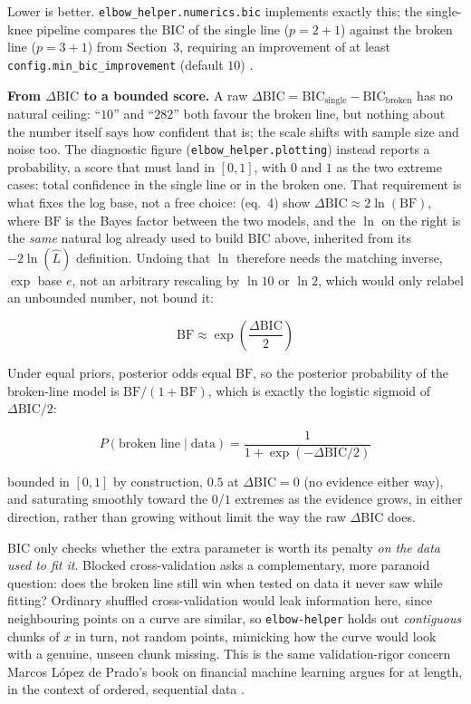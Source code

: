 \documentclass[11pt]{article}
\newcommand{\code}[1]{\texttt{#1}}
\begin{document}
Lower is better. \code{elbow\_helper.numerics.bic} implements exactly
this; the single-knee pipeline compares the $\mathrm{BIC}$ of the single
line ($p = 2 + 1$) against the broken line ($p = 3 + 1$) from Section~3,
requiring an improvement of at least \code{config.min\_bic\_improvement}
(default $10$) \citep{schwarz1978} \citep{hastie2009esl} \citep{bishop2006prml}.

\textbf{From $\Delta\mathrm{BIC}$ to a bounded score.} A raw
$\Delta\mathrm{BIC} = \mathrm{BIC}_{\text{single}} -
\mathrm{BIC}_{\text{broken}}$ has no natural ceiling: ``$10$'' and
``$282$'' both favour the broken line, but nothing about the number itself
says how confident that is; the scale shifts with sample size and noise
too. The diagnostic figure (\code{elbow\_helper.plotting}) instead reports
a probability, a score that must land in $[0, 1]$, with $0$ and $1$ as the
two extreme cases: total confidence in the single line or in the broken
one. That requirement is what fixes the log base, not a free
choice: \citet{kassraftery1995} (eq.~4) show
$\Delta\mathrm{BIC} \approx 2 \ln(\mathrm{BF})$, where $\mathrm{BF}$ is the
Bayes factor between the two models, and the $\ln$ on the right is the
\emph{same} natural log already used to build $\mathrm{BIC}$ above,
inherited from its $-2\ln(\hat L)$ definition. Undoing that $\ln$ therefore
needs the matching inverse, $\exp$ base $e$, not an arbitrary rescaling by
$\ln 10$ or $\ln 2$, which would only relabel an unbounded number, not
bound it:

\begin{equation}
\mathrm{BF} \approx \exp\!\left(\frac{\Delta\mathrm{BIC}}{2}\right)
\end{equation}

Under equal priors, posterior odds equal $\mathrm{BF}$, so the posterior
probability of the broken-line model is $\mathrm{BF} / (1 + \mathrm{BF})$,
which is exactly the logistic sigmoid of $\Delta\mathrm{BIC} / 2$:

\begin{equation}
P(\text{broken line} \mid \text{data}) = \frac{1}{1 + \exp(-\Delta\mathrm{BIC}/2)}
\end{equation}

bounded in $[0, 1]$ by construction, $0.5$ at $\Delta\mathrm{BIC} = 0$ (no
evidence either way), and saturating smoothly toward the $0$/$1$ extremes
as the evidence grows, in either direction, rather than growing without
limit the way the raw $\Delta\mathrm{BIC}$ does.

BIC only checks whether the extra parameter is worth its penalty \emph{on
the data used to fit it}. Blocked cross-validation asks a complementary,
more paranoid question: does the broken line still win when tested on data
it never saw while fitting? Ordinary shuffled cross-validation would leak
information here, since neighbouring points on a curve are similar, so
\code{elbow-helper} holds out \emph{contiguous} chunks of $x$ in turn, not
random points, mimicking how the curve would look with a genuine, unseen
chunk missing. This is the same validation-rigor concern Marcos L\'opez de
Prado's book on financial machine learning argues for at length, in the
context of ordered, sequential data \citeyearpar{lopezdeprado2018financial}.
\end{document}
